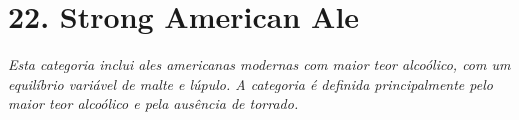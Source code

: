 \section*{22. Strong American Ale}
\textit{Esta categoria inclui ales americanas modernas com maior teor alcoólico, com um equilíbrio variável de malte e lúpulo. A categoria é definida principalmente pelo maior teor alcoólico e pela ausência de torrado.}
